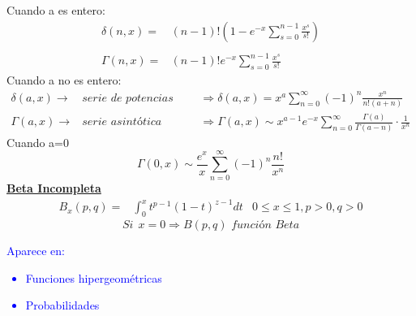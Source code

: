 \documentclass{article}
\theoremstyle{definition}
\begin{document}
Cuando a es entero:
\[
\begin{array}{rl}
	\delta (n,x)=& (n-1)!\left(1-e^{-x}\sum^{n-1}_{s=0}\frac{x^s}{s!}\right)\\
	\\
	\Gamma (n,x)=&(n-1)!e^{-x}\sum^{n-1}_{s=0}\frac{x^s}{s!}
\end{array}
\]
Cuando a no es entero:
\[
\begin{array}{rll}
	\delta (a,x)\rightarrow & \textit{serie de potencias para x pequeno} &\Rightarrow \delta (a,x)=x^a\sum^{\infty}_{n=0}(-1)^n\frac{x^n}{n!(a+n)}\\
	\Gamma (a,x)\rightarrow & \textit{serie asintótica} &\Rightarrow \Gamma (a,x)\sim x^{a-1}e^{-x}\sum^{\infty}_{n=0}\frac{\Gamma (a)}{\Gamma (a-n)}\cdot\frac{1}{x^n}
\end{array}
\]
Cuando a=0
\[\Gamma (0,x)\sim \frac{e^x}{x}\sum^{\infty}_{n=0}(-1)^n \frac{n!}{x^n}\]
\textbf{\underline{Beta Incompleta}}
\[
\begin{array}{rlr}
	B_x (p,q)=&\int^{x}_0t^{p-1}(1-t)^{z-1}dt
	& 0\leq x\leq 1,p>0,q>0
\end{array}
\]
\[Si\ \ x=0\Rightarrow B(p,q) \textit{  función Beta}\]
\textcolor{blue}{Aparece en:
\begin{itemize}
	\item Funciones hipergeométricas
	\item Probabilidades
\end{itemize}}
\end{document}
